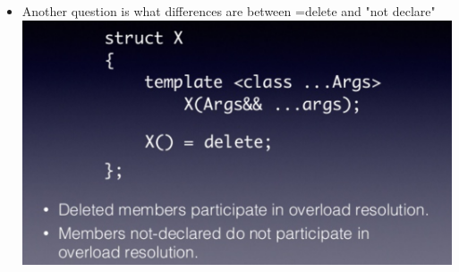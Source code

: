 \documentclass[a4paper,12pt,twoside]{book}
\begin{document}
\begin{itemize}
\item Another question is what differences are between =delete and "not declare" \\
\includegraphics[scale=0.6]{pics/sm5.png} \newline

\end{itemize}
\end{document}
